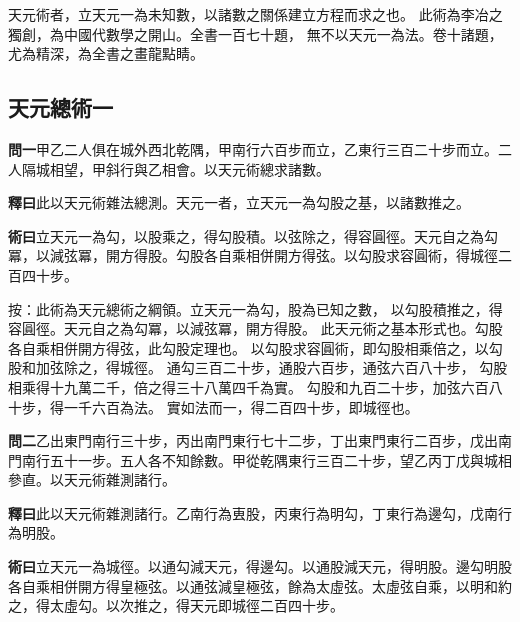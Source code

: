 \documentclass[12pt,a4paper]{article}
\newcommand{\Section}[1]{\subsection*{#1}}
\begin{document}
\noindent
天元術者，立天元一為未知數，以諸數之關係建立方程而求之也。
此術為李冶之獨創，為中國代數學之開山。全書一百七十題，
無不以天元一為法。卷十諸題，尤為精深，為全書之畫龍點睛。

\Section{天元總術一}

\noindent\textbf{問一}\quad 甲乙二人俱在城外西北乾隅，甲南行六百步而立，乙東行三百二十步而立。二人隔城相望，甲斜行與乙相會。以天元術總求諸數。

\vspace{0.3em}

\noindent\textbf{釋曰}\quad 此以天元術雜法總測。天元一者，立天元一為勾股之基，以諸數推之。

\vspace{0.3em}

\noindent\textbf{術曰}\quad 立天元一為勾，以股乘之，得勾股積。以弦除之，得容圓徑。天元自之為勾冪，以減弦冪，開方得股。勾股各自乘相併開方得弦。以勾股求容圓術，得城徑二百四十步。

\vspace{0.3em}

\noindent
按：此術為天元總術之綱領。立天元一為勾，股為已知之數，
以勾股積推之，得容圓徑。天元自之為勾冪，以減弦冪，開方得股。
此天元術之基本形式也。勾股各自乘相併開方得弦，此勾股定理也。
以勾股求容圓術，即勾股相乘倍之，以勾股和加弦除之，得城徑。
通勾三百二十步，通股六百步，通弦六百八十步，
勾股相乘得十九萬二千，倍之得三十八萬四千為實。
勾股和九百二十步，加弦六百八十步，得一千六百為法。
實如法而一，得二百四十步，即城徑也。

\vspace{0.5em}

\noindent\textbf{問二}\quad 乙出東門南行三十步，丙出南門東行七十二步，丁出東門東行二百步，戊出南門南行五十一步。五人各不知餘數。甲從乾隅東行三百二十步，望乙丙丁戊與城相參直。以天元術雜測諸行。

\vspace{0.3em}

\noindent\textbf{釋曰}\quad 此以天元術雜測諸行。乙南行為叀股，丙東行為明勾，丁東行為邊勾，戊南行為明股。

\vspace{0.3em}

\noindent\textbf{術曰}\quad 立天元一為城徑。以通勾減天元，得邊勾。以通股減天元，得明股。邊勾明股各自乘相併開方得皇極弦。以通弦減皇極弦，餘為太虛弦。太虛弦自乘，以明和約之，得太虛勾。以次推之，得天元即城徑二百四十步。
\end{document}
